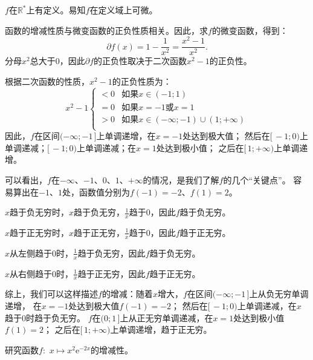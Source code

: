 \documentclass[12pt,UTF8,fontset=none]{ctexbook}
\begin{document}
\begin{so}
    $f$在$\mathbb{R}^*$上有定义。易知$f$在定义域上可微。

    函数的增减性质与微变函数的正负性质相关。因此，求$f$的微变函数，得到：
    $$ \partial f(x) = 1 - \frac{1}{x^2} = \frac{x^2 - 1}{x^2}.$$
    分母$ x^2 $总大于$0$，因此$ \partial f $的正负性取决于二次函数$x^2 - 1$的正负性。
    
    根据二次函数的性质，$x^2 - 1$的正负性质为：
    $$ x^2 - 1 \left\{
        \begin{array}{cl}
            < 0 & \mbox{如果}x \in (-1; 1) \\
            = 0 & \mbox{如果}x = -1 \mbox{或} x = 1 \\
            > 0 & \mbox{如果}x \in (-\infty; -1)\cup (1; +\infty)\\
        \end{array}\right.
    $$
    因此，$f$在区间$(-\infty; -1\,]$上单调递增，在$x = -1$处达到极大值；
    然后在$[\,-1; 0)$上单调递减；$[\,-1; 0)$上单调递减；在$x = 1$处达到极小值；
    之后在$[\,1; +\infty)$上单调递增。

    可以看出，$f$在$-\infty$、$-1$、$0$、$1$、$+\infty$的情况，是我们了解$f$的几个“关键点”。
    容易算出在$-1$、$1$处，函数值分别为$f(-1) = -2$、$f(1) = 2$。
    
    $x$趋于负无穷时，$x$趋于负无穷，$\frac{1}{x}$趋于$0$，因此$f$趋于负无穷。

    $x$趋于正无穷时，$x$趋于正无穷，$\frac{1}{x}$趋于$0$，因此$f$趋于正无穷。

    $x$从左侧趋于$0$时，$\frac{1}{x}$趋于负无穷，因此$f$趋于负无穷。
    
    $x$从右侧趋于$0$时，$\frac{1}{x}$趋于正无穷，因此$f$趋于正无穷。

    综上，我们可以这样描述$f$的增减：随着$x$增大，$f$在区间$(-\infty; -1\,]$上从负无穷单调递增，
    在$x = -1$处达到极大值$f(-1) = -2$；
    然后在$[\,-1; 0)$上单调递减，在$x$趋于$0$时趋于负无穷。
    $f$在$(0; 1\,]$上从正无穷单调递减，在$x = 1$处达到极小值$f(1) = 2$；
    之后在$[\,1; +\infty)$上单调递增，趋于正无穷。
\end{so}

\begin{et}
    研究函数$f:\,\,x\mapsto x^2 \mathrm{e}^{-2x}$的增减性。
\end{et}
\end{document}

